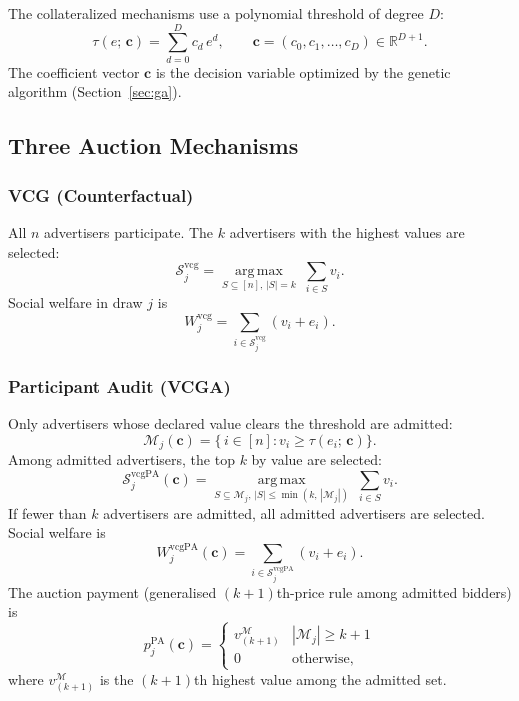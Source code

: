 \documentclass[11pt]{article}
\newcommand{\bsc}{\mathbf{c}}
\begin{document}
The collateralized mechanisms use a polynomial threshold of degree $D$:
\begin{equation}
    \tau(e;\,\bsc) = \sum_{d=0}^{D} c_d\, e^d,
    \qquad \bsc = (c_0, c_1, \ldots, c_D) \in \mathbb{R}^{D+1}.
    \label{eq:tau}
\end{equation}
The coefficient vector $\bsc$ is the decision variable optimized by the genetic
algorithm (Section~\ref{sec:ga}).

\subsection{Three Auction Mechanisms}
\label{sec:mechanisms}

\subsubsection{VCG (Counterfactual)}

All $n$ advertisers participate.  The $k$ advertisers with the highest values
are selected:
\begin{equation}
    \mathcal{S}^{\text{vcg}}_j
    = \operatorname*{arg\,max}_{S \subseteq [n],\,|S|=k}\;\sum_{i \in S} v_i.
\end{equation}
Social welfare in draw $j$ is
\begin{equation}
    W^{\text{vcg}}_j = \sum_{i \in \mathcal{S}^{\text{vcg}}_j} (v_i + e_i).
\end{equation}

\subsubsection{Participant Audit (VCGA)}

Only advertisers whose declared value clears the threshold are admitted:
\begin{equation}
    \mathcal{M}_j(\bsc) = \bigl\{\, i \in [n] : v_i \geq \tau(e_i;\,\bsc) \bigr\}.
    \label{eq:admitted}
\end{equation}
Among admitted advertisers, the top $k$ by value are selected:
\begin{equation}
    \mathcal{S}^{\text{vcgPA}}_j(\bsc)
    = \operatorname*{arg\,max}_{S \subseteq \mathcal{M}_j,\,|S| \leq \min(k,\,|\mathcal{M}_j|)}
      \;\sum_{i \in S} v_i.
    \label{eq:vcga_winners}
\end{equation}
If fewer than $k$ advertisers are admitted, all admitted advertisers are selected.
Social welfare is
\begin{equation}
    W^{\text{vcgPA}}_j(\bsc) = \sum_{i \in \mathcal{S}^{\text{vcgPA}}_j} (v_i + e_i).
\end{equation}
The auction payment (generalised $(k{+}1)$th-price rule among admitted bidders) is
\begin{equation}
    p^{\text{PA}}_j(\bsc) =
    \begin{cases}
        v^{\mathcal{M}}_{(k+1)} & |\mathcal{M}_j| \geq k+1 \\
        0                        & \text{otherwise,}
    \end{cases}
    \label{eq:pa_payment}
\end{equation}
where $v^{\mathcal{M}}_{(k+1)}$ is the $(k{+}1)$th highest value among the admitted set.
\end{document}
